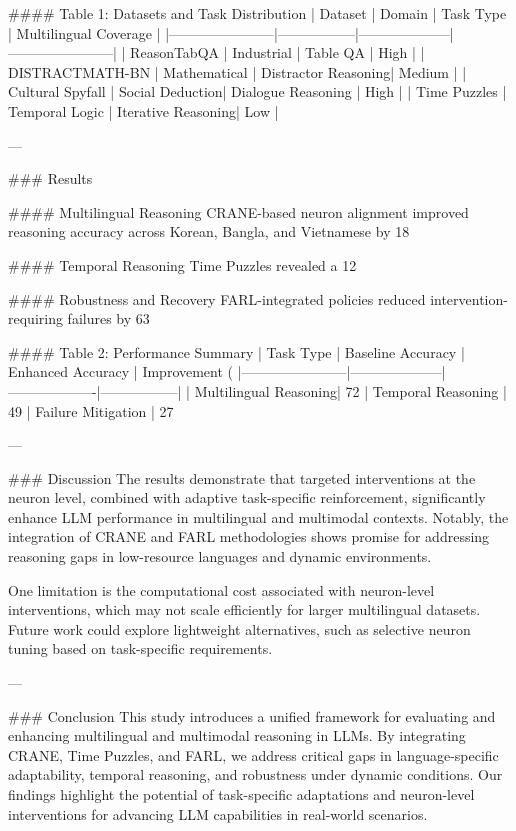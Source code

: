 #### Table 1: Datasets and Task Distribution
| Dataset               | Domain          | Task Type          | Multilingual Coverage |
|-----------------------|-----------------|--------------------|-----------------------|
| ReasonTabQA           | Industrial      | Table QA           | High                 |
| DISTRACTMATH-BN       | Mathematical    | Distractor Reasoning| Medium               |
| Cultural Spyfall      | Social Deduction| Dialogue Reasoning | High                 |
| Time Puzzles          | Temporal Logic  | Iterative Reasoning| Low                  |

---

### Results

#### Multilingual Reasoning
CRANE-based neuron alignment improved reasoning accuracy across Korean, Bangla, and Vietnamese by 18%

#### Temporal Reasoning
Time Puzzles revealed a 12%

#### Robustness and Recovery
FARL-integrated policies reduced intervention-requiring failures by 63%

#### Table 2: Performance Summary
| Task Type             | Baseline Accuracy | Enhanced Accuracy | Improvement (%
|-----------------------|--------------------|-------------------|-----------------|
| Multilingual Reasoning| 72%
| Temporal Reasoning    | 49%
| Failure Mitigation    | 27%

---

### Discussion
The results demonstrate that targeted interventions at the neuron level, combined with adaptive task-specific reinforcement, significantly enhance LLM performance in multilingual and multimodal contexts. Notably, the integration of CRANE and FARL methodologies shows promise for addressing reasoning gaps in low-resource languages and dynamic environments.

One limitation is the computational cost associated with neuron-level interventions, which may not scale efficiently for larger multilingual datasets. Future work could explore lightweight alternatives, such as selective neuron tuning based on task-specific requirements.

---

### Conclusion
This study introduces a unified framework for evaluating and enhancing multilingual and multimodal reasoning in LLMs. By integrating CRANE, Time Puzzles, and FARL, we address critical gaps in language-specific adaptability, temporal reasoning, and robustness under dynamic conditions. Our findings highlight the potential of task-specific adaptations and neuron-level interventions for advancing LLM capabilities in real-world scenarios.

